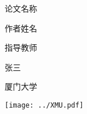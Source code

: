 \documentclass[UTF8]{ctexart}
\begin{document}
\hspace{0.471\textwidth}
\noindent
    \begin{minipage}{0.85\ccwd} %
        \vspace*{25ex} 
    
        论文名称
    
        \vspace{25ex} 
        
        作者姓名 
        
        \vspace{25ex} 
    
        指导教师 
        
        \vspace{25ex} 
        
        张三
        
        \vspace{25ex} 
        
        厦门大学
    
        \vspace{25ex} 
    \end{minipage}
\begin{minipage}{0.5\textwidth}
\texttt{[image: ../XMU.pdf]}
\end{minipage}%
\end{document}
